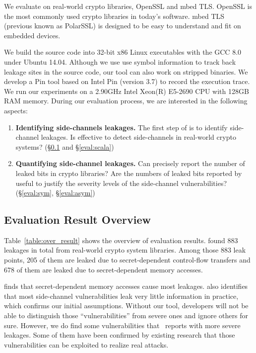 We evaluate \tool{} on real-world crypto libraries, OpenSSL and mbed TLS\@. OpenSSL
is the most commonly used crypto libraries in today's software. mbed TLS\@
(previous known as PolarSSL) is designed to be easy to understand and fit on
embedded devices.

We build the source code into 32-bit x86 Linux executables with the GCC 8.0
under Ubuntu 14.04. Although we use use symbol information to track back leakage
sites in the source code, our tool can also work on stripped binaries. We
develop a Pin tool based on Intel Pin (version 3.7) to record the execution
trace. We run our experiments on a 2.90GHz Intel Xeon(R) E5-2690 CPU with 128GB
RAM memory. During our evaluation process, we are interested in the following
aspects:
\begin{enumerate}
    \item  \textbf{Identifying side-channels leakages.}
          The first step of \tool{} is to identify side-channel leakages. Is
          \tool{} effective to detect side-channels in real-world crypto
          systems? (\S\ref{sec:eval_overview} and \S\ref{eval:scala})
    \item  \textbf{Quantifying side-channel leakages.}
          Can \tool{} precisely report the number of leaked bits in crypto
          libraries? Are the numbers of leaked bits reported by \tool{} useful
          to justify the severity levels of the side-channel vulnerabilities?
          (\S\ref{eval:sym}, \S\ref{eval:asym})
\end{enumerate}

\subsection{Evaluation Result Overview} \label{sec:eval_overview}
Table~\ref{table:over_result} shows the overview of evaluation results. \tool{} found
883 leakages in total from real-world crypto system libraries. Among those 883
leak points, 205 of them are leaked due to secret-dependent control-flow
transfers and 678 of them are leaked due to secret-dependent memory accesses.

\tool{} finds that secret-dependent memory accesses
cause most leakages. \tool{} also identifies that most side-channel
vulnerabilities leak very little information in practice, which confirms our
initial assumptions.  Without our tool, developers will not be able to
distinguish those ``vulnerabilities'' from severe ones and ignore others for sure.
However, we do find some vulnerabilities that \tool\ reports with more severe
leakages. Some of them have been confirmed by existing research that those
vulnerabilities can be exploited to realize real attacks.

